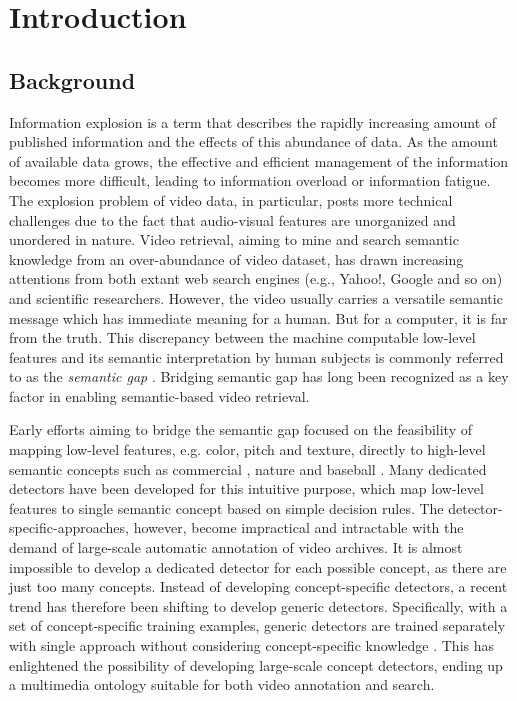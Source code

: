  \setcounter{page}{1}
\chapter{Introduction}


\section{Background}
Information explosion is a term that describes the rapidly
increasing amount of published information and the effects of this
abundance of data. As the amount of available data grows, the
effective and efficient management of the information becomes more
difficult, leading to information overload or information fatigue.
The explosion problem of video data, in particular, posts more
technical challenges due to the fact that audio-visual features are
unorganized and unordered in nature. Video retrieval, aiming to mine
and search semantic knowledge from an over-abundance of video
dataset, has drawn increasing attentions from both extant web search
engines (e.g., Yahoo!, Google and so on) and scientific researchers.
However, the video usually carries a versatile semantic message
which has immediate meaning for a human. But for a computer, it is
far from the truth. This discrepancy between the machine computable
low-level features and its semantic interpretation by human subjects
is commonly referred to as the \emph{semantic gap}
\cite{ArnoldW.M.Smeulders:IEEETPAMI:2000}. Bridging semantic gap has
long been recognized as a key factor in enabling semantic-based
video retrieval.

Early efforts aiming to bridge the semantic gap focused on the
feasibility of mapping low-level features, e.g. color, pitch and
texture, directly to high-level semantic concepts such as commercial
\cite{R.Lienhart:IEEECMCS:1997}, nature \cite{J.R.Smith:IEEEMM:1997}
and baseball \cite{Y.Rui:ACMM:2000}. Many dedicated detectors have
been developed for this intuitive purpose, which map low-level
features to single semantic concept based on simple decision rules.
The detector-specific-approaches, however, become impractical and
intractable with the demand of large-scale automatic annotation of
video archives. It is almost impossible to develop a dedicated
detector for each possible concept, as there are just too many
concepts. Instead of developing concept-specific detectors, a recent
trend has therefore been shifting to develop generic detectors.
Specifically, with a set of concept-specific training examples,
generic detectors are trained separately with single approach
without considering concept-specific knowledge
\cite{MilindR.Naphade:IEEEICOME:2000,A.Amir:TRECVID:2003,C.G.M.Snoek:NISTTRECVID:2005}.
This has enlightened the possibility of developing large-scale
concept detectors, ending up a multimedia ontology suitable for both
video annotation and search.

